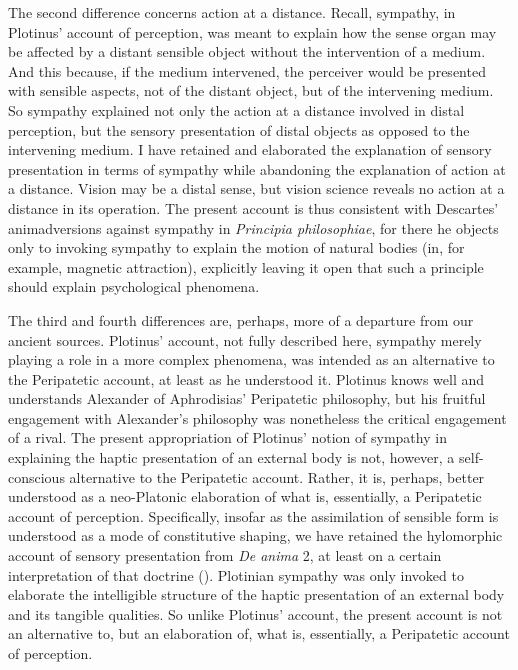 The second difference concerns action at a distance. Recall, sympathy, in Plotinus' account of perception, was meant to explain how the sense organ may be affected by a distant sensible object without the intervention of a medium. And this because, if the medium intervened, the perceiver would be presented with sensible aspects, not of the distant object, but of the intervening medium. So sympathy explained not only the action at a distance involved in distal perception, but the sensory presentation of distal objects as opposed to the intervening medium. I have retained and elaborated the explanation of sensory presentation in terms of sympathy while abandoning the explanation of action at a distance. Vision may be a distal sense, but vision science reveals no action at a distance in its operation. The present account is thus consistent with Descartes' animadversions against sympathy in \emph{Principia philosophiae}, for there he objects only to invoking sympathy to explain the motion of natural bodies (in, for example, magnetic attraction), explicitly leaving it open that such a principle should explain psychological phenomena. 

The third and fourth differences are, perhaps, more of a departure from our ancient sources. Plotinus' account, not fully described here, sympathy merely playing a role in a more complex phenomena, was intended as an alternative to the Peripatetic account, at least as he understood it. Plotinus knows well and understands Alexander of Aphrodisias' Peripatetic philosophy, but his fruitful engagement with Alexander's philosophy was nonetheless the critical engagement of a rival. The present appropriation of Plotinus' notion of sympathy in explaining the haptic presentation of an external body is not, however, a self-conscious alternative to the Peripatetic account. Rather, it is, perhaps, better understood as a neo-Platonic elaboration of what is, essentially, a Peripatetic account of perception. Specifically, insofar as the assimilation of sensible form is understood as a mode of constitutive shaping, we have retained the hylomorphic account of sensory presentation from \emph{De anima} 2, at least on a certain interpretation of that doctrine (\citealt{Kalderon:2015fr}). Plotinian sympathy was only invoked to elaborate the intelligible structure of the haptic presentation of an external body and its tangible qualities. So unlike Plotinus' account, the present account is not an alternative to, but an elaboration of, what is, essentially, a Peripatetic account of perception.

